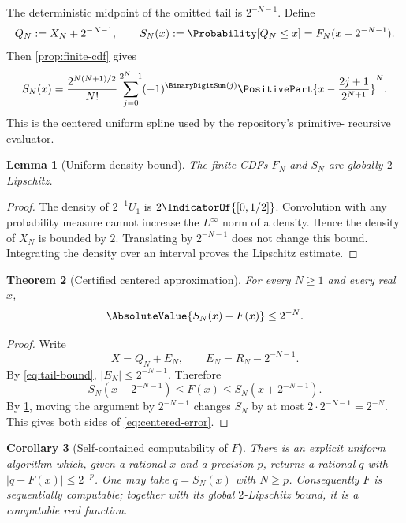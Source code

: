 \documentclass[11pt,oneside]{article}
\newtheorem{theorem}{Theorem}[section]
\newtheorem{lemma}[theorem]{Lemma}
\newtheorem{corollary}[theorem]{Corollary}
\theoremstyle{definition}
\theoremstyle{remark}
\numberwithin{equation}{section}
\begin{document}
The deterministic midpoint of the omitted tail is $2^{-N-1}$.  Define
\begin{equation}\label{eq:centered-truncation}
 Q_N:=X_N+2^{-N-1},
 \qquad
 S_N(x):=\Probability[Q_N\le x]=F_N(x-2^{-N-1}).
\end{equation}
Then \cref{prop:finite-cdf} gives
\begin{equation}\label{eq:centered-spline-formula}
 S_N(x)=
 \frac{2^{N(N+1)/2}}{N!}
 \sum_{j=0}^{2^N-1}(-1)^{\BinaryDigitSum(j)}
 \PositivePart{x-\frac{2j+1}{2^{N+1}}}^{N}.
\end{equation}
This is the centered uniform spline used by the repository's primitive-
recursive evaluator.

\begin{lemma}[Uniform density bound]\label{lem:density-bound}
The finite CDFs $F_N$ and $S_N$ are globally $2$-Lipschitz.
\end{lemma}

\begin{proof}
The density of $2^{-1}U_1$ is $2\IndicatorOf{[0,1/2]}$.  Convolution with any
probability measure cannot increase the $L^\infty$ norm of a density.  Hence
the density of $X_N$ is bounded by $2$.  Translating by $2^{-N-1}$ does not
change this bound.  Integrating the density over an interval proves the
Lipschitz estimate.
\end{proof}

\begin{theorem}[Certified centered approximation]\label{thm:centered-error}
For every $N\ge1$ and every real $x$,
\begin{equation}\label{eq:centered-error}
 \AbsoluteValue{S_N(x)-F(x)}\le2^{-N}.
\end{equation}
\end{theorem}

\begin{proof}
Write
\[
 X=Q_N+E_N,
 \qquad
 E_N=R_N-2^{-N-1}.
\]
By \eqref{eq:tail-bound}, $|E_N|\le2^{-N-1}$.  Therefore
\[
 S_N(x-2^{-N-1})\le F(x)\le S_N(x+2^{-N-1}).
\]
By \cref{lem:density-bound}, moving the argument by $2^{-N-1}$ changes $S_N$
by at most $2\cdot2^{-N-1}=2^{-N}$.  This gives both sides of
\eqref{eq:centered-error}.
\end{proof}

\begin{corollary}[Self-contained computability of $F$]\label{cor:F-computable}
There is an explicit uniform algorithm which, given a rational $x$ and a
precision $p$, returns a rational $q$ with
$|q-F(x)|\le2^{-p}$.  One may take $q=S_N(x)$ with $N\ge p$.
Consequently $F$ is sequentially computable; together with its global
$2$-Lipschitz bound, it is a computable real function.
\end{corollary}
\end{document}
